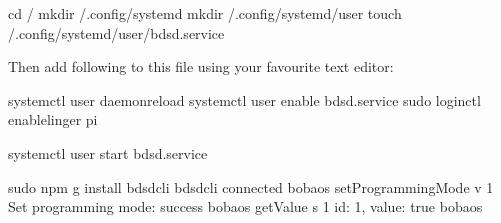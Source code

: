 \documentclass[letterpaper,10pt,english]{sphinxmanual}
\begin{document}

%
\begin{sphinxVerbatim}[commandchars=\\\{\}]
\PYGZdl{} cd \PYGZti{}/
\PYGZdl{} mkdir \PYGZti{}/.config/systemd
\PYGZdl{} mkdir \PYGZti{}/.config/systemd/user
\PYGZdl{} touch \PYGZti{}/.config/systemd/user/bdsd.service
\end{sphinxVerbatim}

Then add following to this file using your favourite text editor:

%
\begin{sphinxVerbatim}[commandchars=\\\{\}]
\PYG{p}{[}\PYG{p}{]}
   

\PYG{p}{[}\PYG{p}{]}
 

\PYG{p}{[}\PYG{p}{]}
\end{sphinxVerbatim}


%
\begin{sphinxVerbatim}[commandchars=\\\{\}]
\PYGZdl{} systemctl \PYGZhy{}\PYGZhy{}user daemon\PYGZhy{}reload
\PYGZdl{} systemctl \PYGZhy{}\PYGZhy{}user enable bdsd.service
\PYGZdl{} sudo loginctl enable\PYGZhy{}linger pi
\end{sphinxVerbatim}


%
\begin{sphinxVerbatim}[commandchars=\\\{\}]
\PYGZdl{} systemctl \PYGZhy{}\PYGZhy{}user start bdsd.service
\end{sphinxVerbatim}


%
\begin{sphinxVerbatim}[commandchars=\\\{\}]
\PYGZdl{} sudo npm \PYGZhy{}g install bdsd\PYGZhy{}cli
\PYGZdl{} bdsd\PYGZhy{}cli
connected
bobaos\PYGZgt{} setProgrammingMode \PYGZhy{}v 1
Set programming mode: success
bobaos\PYGZgt{} getValue \PYGZhy{}s 1
\PYGZob{} id: 1, value: true \PYGZcb{}
bobaos\PYGZgt{}
\end{sphinxVerbatim}
\end{document}
